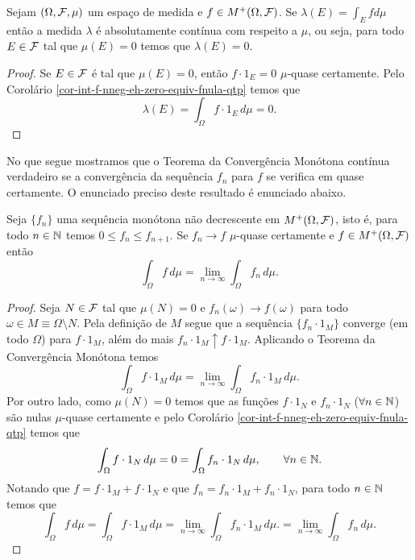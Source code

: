 \begin{corolario}
Sejam $(\Omega,\mathcal{F},\mu)$ um espaço de medida e 
$f\in M^{+}(\Omega,\mathcal{F})$. Se  
$\lambda(E)=\int_{E}f d\mu$ então a medida 
$\lambda$ é absolutamente contínua com respeito 
a $\mu$, ou seja, para todo $E\in\mathcal{F}$ tal que 
$\mu(E)=0$ temos que $\lambda(E)=0$. 
\end{corolario}


\begin{proof}
Se $E\in\mathcal{F}$ é tal que $\mu(E)=0$, 
então $f\cdot 1_{E} =0$ $\mu$-quase certamente.
Pelo Corolário \ref{cor-int-f-nneg-eh-zero-equiv-fnula-qtp}
temos que 
	\[
		\lambda(E)
		=
		\int_{\Omega}f\cdot 1_{E}\, d\mu
		=
		0.
	\]
\end{proof}






No que segue mostramos que o Teorema 
da Convergência Monótona contínua 
verdadeiro se a convergência da sequência 
$f_n$ para $f$ se verifica em quase certamente.
O enunciado preciso deste resultado é enunciado 
abaixo.





\begin{corolario}
\label{Teo-TCM-quase-certamente}
Seja $\{f_n\}$ uma sequência monótona
não decrescente em 
$M^{+}(\Omega,\mathcal{F})$, isto é, 
para todo $n\in\mathbb{N}$ temos $0\leq f_n\leq f_{n+1}$.
Se $f_n \to f$ $\mu$-quase certamente 
e $f\in M^{+}(\Omega,\mathcal{F})$ então
	\[
	\int_{\Omega} f\, d\mu 
	=
	\lim_{n\to\infty}\int_{\Omega} f_n\, d\mu.
	\]
\end{corolario}
 
 
\begin{proof}
Seja $N\in \mathcal{F}$ tal que $\mu(N)=0$ e 
$f_n(\omega)\to f(\omega)$ para todo 
$\omega\in M\equiv \Omega\setminus N$.
Pela definição de $M$ segue que a sequência
$\{f_n\cdot 1_{M}\}$ converge (em todo $\Omega$)
para $f\cdot 1_{M}$, além do mais 
$f_n\cdot 1_{M}\uparrow f\cdot 1_{M}$.
Aplicando o Teorema da Convergência Monótona 
temos 
	\[
		\int_{\Omega} f\cdot 1_{M}\, d\mu 
		=
		\lim_{n\to\infty} \int_{\Omega} f_n\cdot 1_{M}\, d\mu.
	\]
Por outro lado, como $\mu(N)=0$ temos que 
as funções $f\cdot 1_{N}$ e $f_n\cdot 1_{N}$
($\forall n\in\mathbb{N}$) 
são nulas $\mu$-quase certamente e 
pelo Corolário \ref{cor-int-f-nneg-eh-zero-equiv-fnula-qtp}
temos que 
	\[
		\int_{\Omega} f\cdot 1_{N}\, d\mu 
		=
		0
		=
		\int_{\Omega} f_n\cdot 1_{N}\, d\mu,
		\qquad\forall n\in\mathbb{N}.	
	\]
Notando que $f=f\cdot 1_{M}+f\cdot 1_{N}$ e 
que $f_n=f_n\cdot 1_{M}+f_n\cdot 1_{N}$, 
para todo $n\in\mathbb{N}$ temos que 
	\[
	\int_{\Omega}f\, d\mu 
	=
	\int_{\Omega} f\cdot 1_{M}\, d\mu 
	=
	\lim_{n\to\infty} \int_{\Omega} f_n\cdot 1_{M}\, d\mu.	
	=
	\lim_{n\to\infty} \int_{\Omega} f_n\, d\mu.	
	\]
\end{proof}











